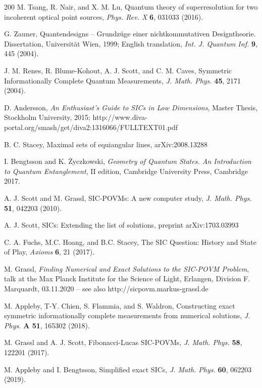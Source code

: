 \documentclass[english,aps,pra,nofootinbib,twocolumn,superscriptaddress]{revtex4-1}
\newcommand{\1}{{\rm 1\hspace{-0.9mm}l}}
\begin{document}
\begin{thebibliography}{200}
 M. Tsang, R. Nair, and X. M. Lu, 
 Quantum theory of superresolution for two incoherent optical point sources,
{\sl Phys. Rev. X} {\bf 6}, 031033 (2016).

 G. Zauner, Quantendesigns -- Grundz{\"u}ge einer nichtkommutativen Designtheorie. Dissertation, Universit{\"a}t Wien, 1999;
English translation,
{\sl Int. J. Quantum Inf.} {\bf  9}, 445 (2004).

 J. M. Renes, R. Blume-Kohout, A. J. Scott, and C. M. Caves, 
Symmetric Informationally Complete Quantum Measurements, 
{\sl J. Math. Phys.} {\bf  45}, 2171 (2004).

 D. Andersson, 
{\sl An Enthusiast's Guide to SICs in Low Dimensions},
Master Thesis, Stockholm University, 2015;
http://www.diva-portal.org/smash/get/diva2:1316066/FULLTEXT01.pdf

 B. C. Stacey, 
 Maximal sets of equiangular lines, arXiv:2008.13288

 I. Bengtsson and K. {\.Z}yczkowski, 
{\sl Geometry of Quantum States.
An Introduction to Quantum Entanglement},
II edition, Cambridge University Press, Cambridge 2017.

A. J. Scott and M. Grassl,  SIC-POVMs: A new computer study,
{\sl J. Math. Phys.} {\bf  51}, 042203   (2010).

  A. J. Scott,
  SICs: Extending the list of solutions,
 preprint  arXiv:1703.03993

 C. A. Fuchs, M.C.  Hoang, and B.C. Stacey, 
The SIC Question: History and State of Play,
{\sl Axioms} {\bf 6}, 21 (2017).

 M. Grassl, {\sl Finding Numerical and Exact Solutions to the SIC-POVM Problem},
talk at the Max Planck Institute for the Science of Light, Erlangen, 
Division F. Marquardt, 03.11.2020 -- see also http://sicpovm.markus-grassl.de

M. Appleby, T-Y. Chien, S. Flammia, and S. Waldron, 
Constructing exact symmetric informationally complete measurements from numerical solutions,
{\sl  J. Phys.} {\bf  A 51}, 165302 (2018).

 M. Grassl and A. J. Scott,
Fibonacci-Lucas SIC-POVMs,
{\sl J. Math. Phys.} {\bf  58}, 122201 (2017).

 M. Appleby and I. Bengtsson, 
 Simplified exact SICs,
 {\sl J. Math. Phys.} {\bf 60}, 062203 (2019). 


\end{thebibliography}
\end{document}
